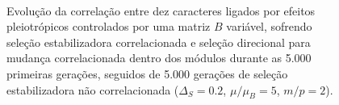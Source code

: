 \begin{figure}[htbp]
  \vspace{-18pt}
  \vspace{11pt}
  \\
  \caption{Evolução da correlação entre dez caracteres ligados por efeitos
  pleiotrópicos controlados por uma matriz $B$ variável, sofrendo
  seleção estabilizadora correlacionada e seleção direcional para
  mudança correlacionada dentro dos módulos durante as 5.000
  primeiras gerações, seguidos de 5.000 gerações de seleção
  estabilizadora não correlacionada ($\Delta_S = 0.2$, $\mu/\mu_B=5$,
  $m/p=2$).}
  \label{posselecaoSemEstab}
\end{figure}



